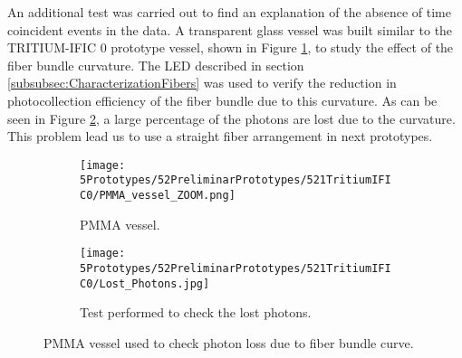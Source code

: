 An additional test was carried out to find an explanation of the absence of time coincident events in the data. A transparent glass vessel was built similar to the TRITIUM-IFIC 0 prototype vessel, shown in Figure \ref{subfig:PMMAVesselToTestLostPhotons}, to study the effect of the fiber bundle curvature. The LED described in section \ref{subsubsec:CharacterizationFibers} was used to verify the reduction in photocollection efficiency of the fiber bundle due to this curvature. As can be seen in Figure \ref{subfig:TestLostPhotons}, a large percentage of the photons are lost due to the curvature. This problem lead us to use a straight fiber arrangement in next prototypes.

\begin{figure}
\centering
    \begin{subfigure}[b]{0.45\textwidth}
    \centering
    \texttt{[image: 5Prototypes/52PreliminarPrototypes/521TritiumIFIC0/PMMA\_vessel\_ZOOM.png]}  
    \caption{PMMA vessel.\label{subfig:PMMAVesselToTestLostPhotons}}
    \end{subfigure}
    \hfill
    \begin{subfigure}[b]{0.45\textwidth}
    \centering
    \texttt{[image: 5Prototypes/52PreliminarPrototypes/521TritiumIFIC0/Lost\_Photons.jpg]}  
    \caption{Test performed to check the lost photons.\label{subfig:TestLostPhotons}}
    \end{subfigure}
 \caption{PMMA vessel used to check photon loss due to fiber bundle curve.}
 \label{fig:TestLostPhotons}
\end{figure}







